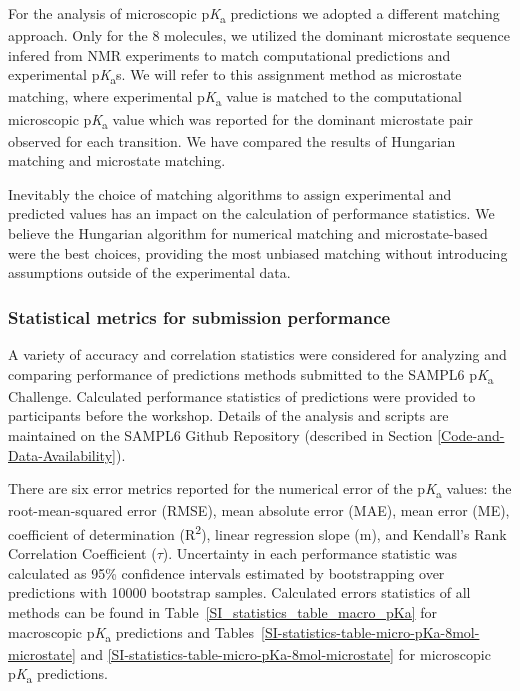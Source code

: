 \documentclass[9pt,lineno,final]{elife}
\newcommand{\pKa}{p\textit{K}\textsubscript{a}}
\begin{document}
For the analysis of microscopic \pKa{} predictions we adopted a different matching approach. 
Only for the 8 molecules, we utilized the dominant microstate sequence infered from NMR experiments to match computational predictions and experimental \pKa{}s. 
We will refer to this assignment method as microstate matching, where experimental \pKa{} value is matched to the computational microscopic \pKa{} value which was reported for the dominant microstate pair observed for each transition. 
We have compared the results of Hungarian matching and microstate matching. 

Inevitably the choice of matching algorithms to assign experimental and predicted values has an impact on the calculation of performance statistics. We believe the Hungarian algorithm for numerical matching and microstate-based were the best choices, providing the most unbiased matching without introducing assumptions outside of the experimental data.

\subsubsection{Statistical metrics for submission performance}

A variety of accuracy and correlation statistics were considered for analyzing and comparing performance of predictions methods submitted to the SAMPL6 \pKa{} Challenge. 
Calculated performance statistics of predictions were provided to participants before the workshop. 
Details of the analysis and scripts are maintained on the SAMPL6 Github Repository (described in Section \ref{Code-and-Data-Availability}).

There are six error metrics reported for the numerical error of the \pKa{} values: the root-mean-squared error (RMSE), mean absolute error (MAE), mean error (ME), coefficient of determination (R\textsuperscript{2}), linear regression slope (m), and Kendall’s Rank Correlation Coefficient ($\tau$).
Uncertainty in each performance statistic was calculated as 95\% confidence intervals estimated by bootstrapping over predictions with 10000 bootstrap samples. 
Calculated errors statistics of all methods can be found in Table~\ref{SI_statistics_table_macro_pKa} for macroscopic \pKa{} predictions and Tables~\ref{SI-statistics-table-micro-pKa-8mol-microstate} and \ref{SI-statistics-table-micro-pKa-8mol-microstate} for microscopic \pKa{} predictions. 
\end{document}
